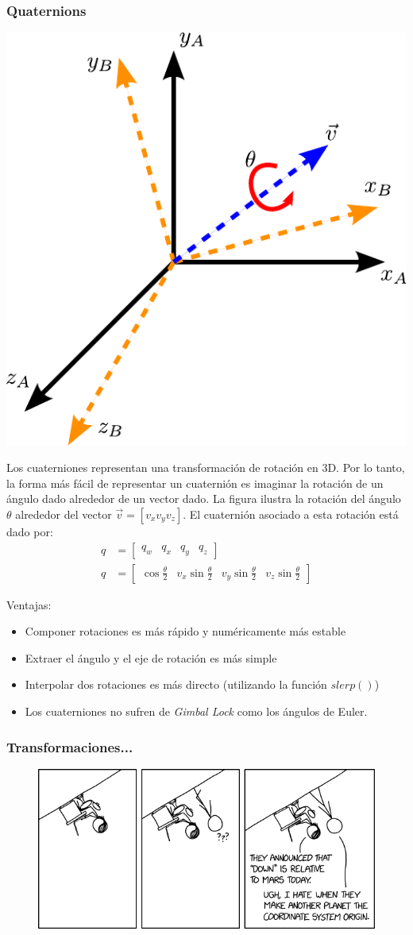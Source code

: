 \begin{frame}
    \frametitle{Quaternions}
    \scriptsize
    \begin{center}
        \includegraphics[width=0.2\columnwidth]{./images/quaternion.pdf}
    \end{center}

    Los cuaterniones representan una transformación de rotación en 3D. Por lo tanto, la forma más fácil de representar un cuaternión es imaginar la rotación de un ángulo dado alrededor de un vector dado. La figura ilustra la rotación del ángulo $\theta$ alrededor del vector $\vec{v} = [v_{x} v_{y} v_{z}]$. El cuaternión asociado a esta rotación está dado por:
    \begin{align*}
        q &= \begin{bmatrix} q_w & q_x & q_y & q_z\end{bmatrix}\\
        q &= \begin{bmatrix}
            \cos \frac{\theta}{2} & v_{x} \sin \frac{\theta}{2} & v_{y} \sin \frac{\theta}{2} & v_{z}\sin \frac{\theta}{2}
        \end{bmatrix}
    \end{align*}

    Ventajas:
    \begin{itemize}
        \item Componer rotaciones es más rápido y numéricamente más estable
        \item Extraer el ángulo y el eje de rotación es más simple
        \item Interpolar dos rotaciones es más directo (utilizando la función $slerp()$)
        \item Los cuaterniones no sufren de \emph{Gimbal Lock} como los ángulos de Euler.
    \end{itemize}

\end{frame}

\begin{frame}
    \frametitle{Transformaciones...}
    
    \begin{figure}[!h]
        \includegraphics[width=\columnwidth]{./images/joke_coordinate_systems.png}
    \end{figure}
    
\end{frame}
